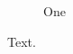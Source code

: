 \documentclass{ieeeaccess}
\begin{document}
\begin{figure}\caption{One}\end{figure}
Text.\EOD
\end{document}
